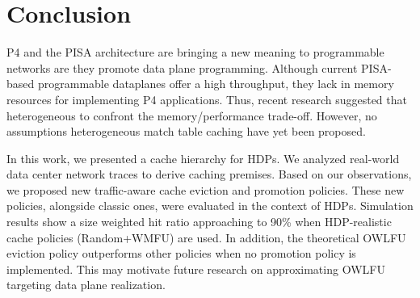 \section{Conclusion}\label{sec:conclusion}

P4 and the PISA architecture are bringing a new meaning to programmable networks are they promote data plane programming.
Although current PISA-based programmable dataplanes offer a high throughput, they lack in memory resources for implementing P4 applications.
Thus, recent research suggested that heterogeneous to confront the memory/performance trade-off.
However, no assumptions heterogeneous match table caching have yet been proposed.

In this work, we presented a cache hierarchy for HDPs.
We analyzed real-world data center network traces to derive caching premises.
Based on our observations, we proposed new traffic-aware cache eviction and promotion policies.
These new policies, alongside classic ones, were evaluated in the context of HDPs.
Simulation results show a size weighted hit ratio approaching to 90\% when HDP-realistic cache policies (Random+WMFU) are used.
In addition, the theoretical OWLFU eviction policy outperforms other policies when no promotion policy is implemented.
This may motivate future research on approximating OWLFU targeting data plane realization. 